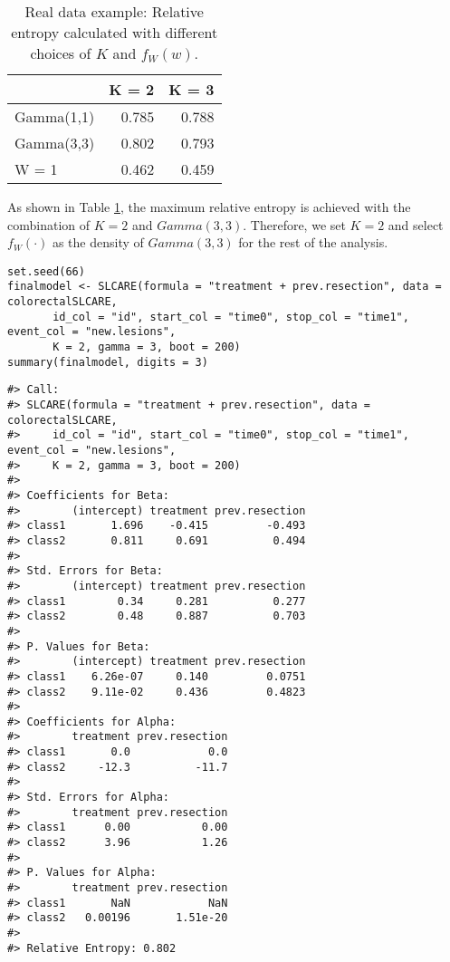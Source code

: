 \begin{table}
\centering
\caption{\label{tab:realentropytable-static}Real data example: Relative entropy calculated with different
choices of $K$ and $f_{W}(w)$.}
\centering
\begin{tabular}[t]{lrr}
\toprule
 & K = 2 & K = 3\\
\midrule
Gamma(1,1) & 0.785 & 0.788\\
Gamma(3,3) & 0.802 & 0.793\\
W = 1 & 0.462 & 0.459\\
\bottomrule
\end{tabular}
\end{table}

As shown in Table \ref{tab:realentropytable-static}, the maximum relative entropy is achieved with the combination of \(K=2\) and \(Gamma(3,3)\). Therefore, we set \(K=2\) and select \(f_W(\cdot)\) as the density of \(Gamma(3,3)\) for the rest of the analysis.

\begin{verbatim}
set.seed(66)
finalmodel <- SLCARE(formula = "treatment + prev.resection", data = colorectalSLCARE,
       id_col = "id", start_col = "time0", stop_col = "time1", event_col = "new.lesions",
       K = 2, gamma = 3, boot = 200)
summary(finalmodel, digits = 3)
\end{verbatim}

\begin{verbatim}
#> Call:
#> SLCARE(formula = "treatment + prev.resection", data = colorectalSLCARE, 
#>     id_col = "id", start_col = "time0", stop_col = "time1", event_col = "new.lesions", 
#>     K = 2, gamma = 3, boot = 200)
#> 
#> Coefficients for Beta:
#>        (intercept) treatment prev.resection
#> class1       1.696    -0.415         -0.493
#> class2       0.811     0.691          0.494
#> 
#> Std. Errors for Beta:
#>        (intercept) treatment prev.resection
#> class1        0.34     0.281          0.277
#> class2        0.48     0.887          0.703
#> 
#> P. Values for Beta:
#>        (intercept) treatment prev.resection
#> class1    6.26e-07     0.140         0.0751
#> class2    9.11e-02     0.436         0.4823
#> 
#> Coefficients for Alpha:
#>        treatment prev.resection
#> class1       0.0            0.0
#> class2     -12.3          -11.7
#> 
#> Std. Errors for Alpha:
#>        treatment prev.resection
#> class1      0.00           0.00
#> class2      3.96           1.26
#> 
#> P. Values for Alpha:
#>        treatment prev.resection
#> class1       NaN            NaN
#> class2   0.00196       1.51e-20
#> 
#> Relative Entropy: 0.802
\end{verbatim}

